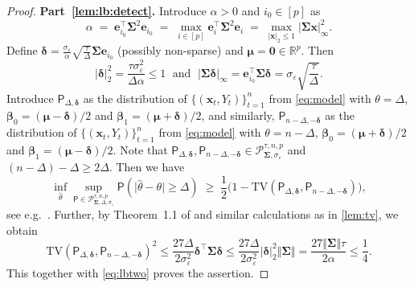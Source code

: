 \documentclass[11pt, a4paper]{article}
\newcommand{\mbf}{\mathbf}
\newcommand{\mc}{\mathcal}
\newcommand{\vep}{\varepsilon}
\renewcommand{\l}{\left}
\renewcommand{\r}{\right}
\def\wh{\widehat}
\newcommand{\p}{\mathsf{P}}
\newcommand{\R}{\mathbb{R}}
\theoremstyle{definition}
\theoremstyle{definition}
\theoremstyle{definition}
\theoremstyle{definition}
\theoremstyle{definition}
\theoremstyle{remark}
\theoremstyle{definition}
\theoremstyle{definition}
\theoremstyle{definition}
\begin{document}
\begin{proof}
{\bf Part~\ref{lem:lb:detect}.}
Introduce \(\alpha > 0\) and \(i_0 \in [p]\) as 
\[
\alpha \;= \;\bm e_{i_0}^\top \bm\Sigma^2 \bm e_{i_0} \;= \; \max_{i\in[p]}\bm e_i^\top \bm\Sigma^2 \bm e_i  \;=\; \max_{\vert\mbf x\vert_2\le 1} \vert\bm\Sigma \mbf x\vert_\infty^2.
\]
Define $\bm \delta = \tfrac{\sigma_{\vep}}{\alpha}\sqrt{\tfrac{\tau}{\Delta}}\bm\Sigma \bm e_{i_0}$ (possibly non-sparse) and $\bm\mu  = \bm 0 \in \R^p$. Then
\[
\vert\bm\delta\vert_2^2 = \frac{\tau \sigma_{\vep}^2}{\Delta \alpha} \le 1\;\text{ and }\; \vert\bm\Sigma\bm\delta\vert_{\infty} = \bm e_{i_0}^\top \bm\Sigma\bm\delta = \sigma_{\vep}\sqrt{\frac{\tau}{\Delta}}.
\]
Introduce $\p_{\Delta,\bm\delta}$ as the distribution of $\{(\mbf x_t, Y_t)\}_{t = 1}^n$ from \eqref{eq:model} with $\theta = \Delta$, $\bm\beta_0 = (\bm\mu -\bm\delta)/2$ and $\bm\beta_1 = (\bm\mu +\bm\delta)/2$, and similarly, $\p_{n - \Delta, -\bm\delta}$ as the distribution of $\{(\mbf x_t, Y_t)\}_{t = 1}^n$ from \eqref{eq:model} with $\theta = n - \Delta$, $\bm\beta_0 = (\bm\mu + \bm\delta)/2$ and $\bm\beta_1 = (\bm\mu -\bm\delta)/2$. Note that $\p_{\Delta, \bm\delta}, \p_{n-\Delta, -\bm\delta} \in \mc P^{\tau, n, p}_{\bm\Sigma, \sigma_{\vep}}$ and $(n-\Delta) - \Delta \ge 2 \Delta$. Then we have
\begin{equation}\label{eq:lbtwo}
\inf_{\wh\theta} \sup_{\p \in \mc P_{\bm\Sigma, \Delta, \sigma_{\vep}}^{\tau, n, p}} \p\l(\bigl\vert\wh\theta -\theta\bigr\vert \ge \Delta\r) \;\ge\; \frac{1}{2}\bigl(1 - \mathrm{TV}(\p_{\Delta,\bm\delta},\p_{n - \Delta, -\bm\delta})\bigr),
\end{equation}
see e.g.\ \citet[Theorem~2.2]{Tsy09}. Further, 
by Theorem~1.1 of \citet{devroye2018total} and similar calculations as in \cref{lem:tv}, we obtain
$$
\mathrm{TV}(\p_{\Delta,\bm\delta},\p_{n - \Delta, -\bm\delta})^2 \le \frac{27\Delta}{2\sigma^2_{\vep}}\bm\delta^\top\bm\Sigma\bm\delta  \le \frac{27\Delta}{2\sigma^2_{\vep}}\vert\bm\delta\vert_2^2\Vert\bm\Sigma\Vert = \frac{27\Vert\bm\Sigma\Vert\tau}{2\alpha} \le \frac{1}{4}.
$$
This together with \eqref{eq:lbtwo} proves the assertion. 

\bigskip


\end{proof}
\end{document}
